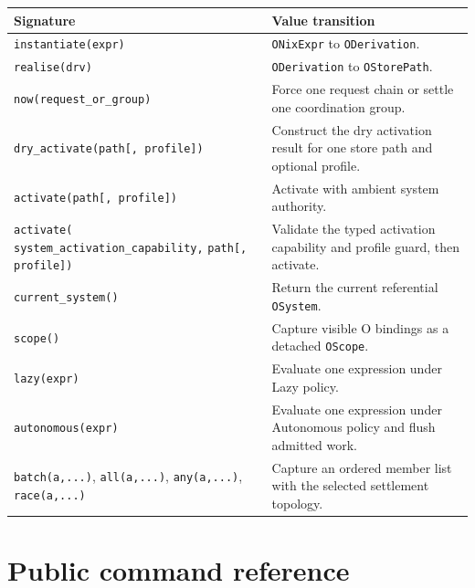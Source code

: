 \documentclass[11pt,oneside]{article}
\begin{document}
\begin{longtable}{P{0.38\textwidth} P{0.54\textwidth}}
\toprule
\textbf{Signature} & \textbf{Value transition} \\
\midrule
\endhead
\texttt{instantiate(expr)} & \texttt{ONixExpr} to
\texttt{ODerivation}. \\
\texttt{realise(drv)} & \texttt{ODerivation} to
\texttt{OStorePath}. \\
\texttt{now(request\_or\_group)} & Force one request chain or settle one
coordination group. \\
\texttt{dry\_activate(path[, profile])} & Construct the dry activation result
for one store path and optional profile. \\
\texttt{activate(path[, profile])} & Activate with ambient system authority. \\
\texttt{activate(}\newline
\texttt{system\_activation\_capability,}\newline
\texttt{path[, profile])} & Validate the typed activation capability and
profile guard, then activate. \\
\texttt{current\_system()} & Return the current referential
\texttt{OSystem}. \\
\texttt{scope()} & Capture visible O bindings as a detached
\texttt{OScope}. \\
\texttt{lazy(expr)} & Evaluate one expression under Lazy policy. \\
\texttt{autonomous(expr)} & Evaluate one expression under Autonomous policy
and flush admitted work. \\
\texttt{batch(a,...)}, \texttt{all(a,...)}, \texttt{any(a,...)},
\texttt{race(a,...)} & Capture an ordered member list with the selected
settlement topology. \\
\bottomrule
\end{longtable}

\section{Public command reference}
\end{document}
